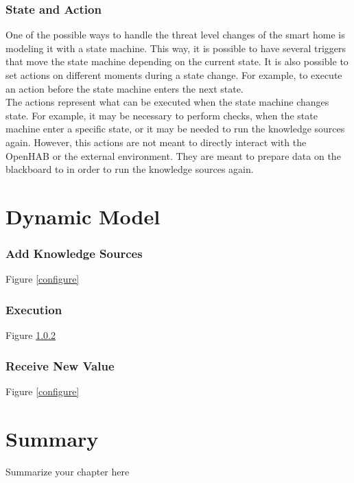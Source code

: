 \subsubsection{State and Action}
\label{StateMachine}
One of the possible ways to handle the threat level changes of the smart home is modeling it with a state machine. This way, it is possible to have several triggers that move the state machine depending on the current state. It is also possible to set actions on different moments during a state change. For example, to execute an action before the state machine enters the next state.
\\%
The actions represent what can be executed when the state machine changes state. For example, it may be necessary to perform checks, when the state machine enter a specific state, or it may be needed to run the knowledge sources again. However, this actions are not meant to directly interact with the OpenHAB or the external environment. They are meant to prepare data on the blackboard to in order to run the knowledge sources again.


\section{Dynamic Model}

\subsubsection{Add Knowledge Sources}
\label{addKnowledgeSources}
Figure \ref{configure}


\subsubsection{Execution}
\label{execute}\textsl{}
Figure \ref{execute}

\subsubsection{Receive New Value}
\label{ReceiveNewValue}
Figure \ref{configure}

\section{Summary}

Summarize your chapter here
					
